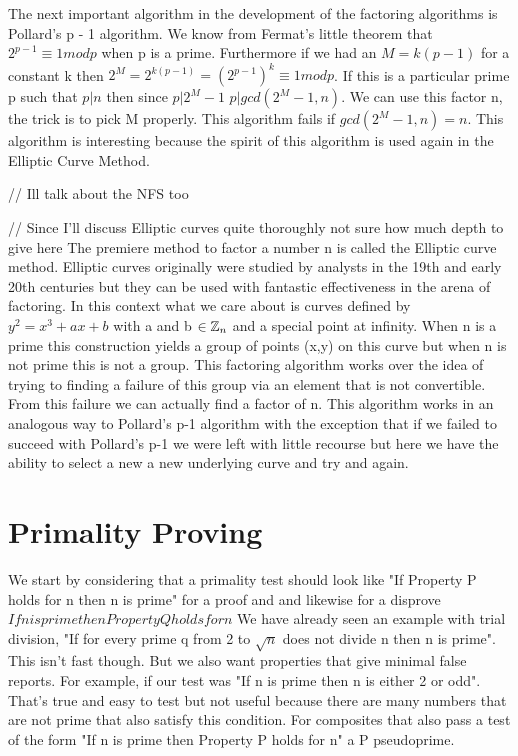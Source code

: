 \documentclass{article}
\begin{document}
The next important algorithm in the development of the factoring algorithms is Pollard's p - 1 algorithm.  We know from Fermat's little theorem that $2^{p-1} \equiv 1 mod p$ when p is a prime. Furthermore  if we had an $M = k ( p - 1 ) $ for a constant k then $2^M = 2^{ k  ( p - 1 ) } = ( 2^{ p -1 } ) ^ k \equiv 1 mod p$. If this is a particular prime p such that $p | n$ then since $ p | 2^M - 1 $ $ p | gcd ( 2^M - 1 , n )$. We can use this factor n, the trick is to pick M properly. This algorithm fails if $gcd ( 2^M - 1 , n )  = n$. This algorithm is interesting because the spirit of this algorithm is used again in the Elliptic Curve Method. 

// Ill talk about the NFS too 

// Since I'll discuss Elliptic curves quite thoroughly not sure how much depth to give here
The premiere method to factor a number n is called the Elliptic curve method.   Elliptic curves originally were studied by analysts in the 19th and early 20th centuries but they can be used with fantastic effectiveness in the arena of factoring. In this context what we care about is curves defined by $y^2 = x^3 + ax + b$ with a and b $\in \mathbb{Z} _n$ and a special point at infinity. When n is a prime this construction yields a group of points (x,y) on this curve but when n is not prime this is not a group. This factoring algorithm works over the idea of trying to finding a failure of this group via an element that is not convertible. From this failure we can actually find a factor of n. This algorithm works in an analogous way to Pollard's p-1 algorithm with the exception that if we failed to succeed with Pollard's p-1 we were left with little recourse but here we have the ability to select a new a new underlying curve and try and again. 
 
 
\section{Primality Proving}
We start by considering that a primality test should look like "If Property P holds for n then n is prime"  for a proof and and likewise for a disprove $If n is prime then Property Q holds for n$ We have already seen an example with trial division, "If for every prime q from 2 to $\sqrt{n}$ does not divide n  then n is prime". This isn't fast though. But we also want properties that  give minimal false reports. For example, if our test was "If n is prime then n is either 2 or odd". That's true and easy to test but not useful because there are many numbers that are not prime that also satisfy this condition.  For composites that also pass a test of the form "If n is prime then Property P holds for n" a P pseudoprime. 
\end{document}

